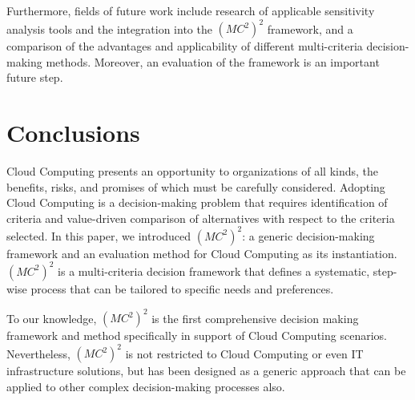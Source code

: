 \documentclass[journal,final,a4paper,twoside]{IEEEtran}
\begin{document}
Furthermore, fields of future work include research of applicable sensitivity analysis tools and the integration into the $(MC^2)^2$ framework, and a comparison of the advantages and applicability of different multi-criteria decision-making methods. Moreover, an evaluation of the framework is an important future step.

\section{Conclusions}
\label{conclude}
Cloud Computing presents an opportunity to organizations of all kinds, the benefits, risks, and promises of which must be carefully considered. Adopting Cloud Computing is a decision-making problem that requires identification of criteria and value-driven comparison of alternatives with respect to the criteria selected.
In this paper, we introduced $(MC^2)^2$: a generic decision-making framework and an evaluation method for Cloud Computing as its instantiation. $(MC^2)^2$ is a multi-criteria decision framework that defines a systematic, step-wise process that can be tailored to specific needs and preferences.

To our knowledge, $(MC^2)^2$ is the first comprehensive decision making framework and method specifically in support of Cloud Computing scenarios. Nevertheless, $(MC^2)^2$ is not restricted to Cloud Computing or even IT infrastructure solutions, but has been designed as a generic approach that can be applied to other complex decision-making processes also.





















\ifCLASSOPTIONcaptionsoff
  \newpage
\fi









\end{document}
